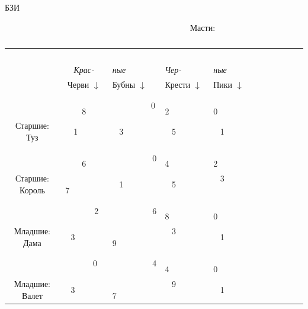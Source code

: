 \begin{problem}
\begin{source}
БЗИ
\end{source}
 \begin{table}[hbt]  \caption{}
~~~~~~~~~~~~~~~~~~~~~~~~~~~~~~~~~~~~~~~~~~~~ Масти:  \\
{\begin{tabular}{cc|l|l|l|l}
               &      &             &~~~          &    &     \\
               &     {\em Крас- }      &  {\em ные }      &  {\em Чер-}     &  {\em ные }  &      \\
\cline{2-5}%
               & Черви $\downarrow$ &   Бубны $\downarrow$ & Крести $\downarrow$ &     Пики $
\downarrow$ &            \\
\cline{2-5}%
             ~~~   &~~~ ~~~~~ 8 &~~~ ~~~~~ 0 &~~~~~~~~~  2 &~~~~~~~~~  0 &~~~~~~~~~   \\
   Старшие: Туз &~  1~~~ ~~&~ 3~~~ ~~ &~ 5         ~&~ 1        ~&~         \\
\cline{2-5}%
                 &~~~ ~~~~~ 6&~~~~~~~~~ 0  &~~~~~~~~~  4 &~~~~~~~~~  2 &~~~~~~~~~   \\
   Старшие: Король &~ 7~~~~~~~~&~ 1~~~~~~~~  &~ 5~~~~ ~~ &~ 3~ ~~~~~~ &~  ~ \\
\cline{2-5}%
                 &~ ~~ ~~ 2~&~~~~~~~~~ 6  &~~~~~~~~~  8 &~~~~~~~~~  0 &~~~~~~~~~   \\
   Младшие:  Дама &~ 3~~~~~~~&~ 9~~~~~~~~~ &~  3~~~~~ ~~ &~ 1~~~~~~~ &~  ~~~~~ \\
\cline{2-5}%
\cline{2-5}%
                  &~ ~~~ ~0~&~~~~~~~~~ 4  &~~~~~~~~~ 4 &~~~~~~~~~ 0  &~~~~~~~~~   \\
 Младшие:  Валет  &~ 3~~~~~~~&~ 7~~~~~~~~~ &~ 9~~~~~ ~~ &~ 1~~~~~~~ &~  ~~~~~~~ \\
\cline{2-5}%
\end{tabular}}\label{cards}
\end{table}


\end{problem}
